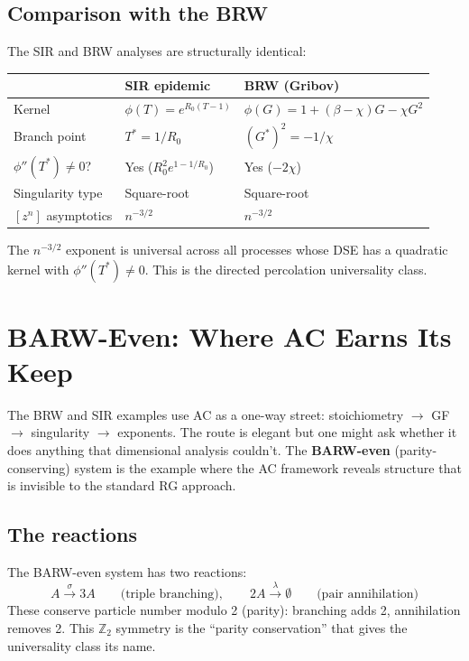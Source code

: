 \documentclass[11pt,a4paper]{article}
\theoremstyle{definition}
\begin{document}
\subsection{Comparison with the BRW}

The SIR and BRW analyses are structurally identical:
\begin{center}
\begin{tabular}{lll}
\toprule
& \textbf{SIR epidemic} & \textbf{BRW (Gribov)} \\
\midrule
Kernel & $\phi(T) = e^{R_0(T-1)}$ & $\phi(G) = 1 + (\beta{-}\chi)G - \chi G^2$ \\
Branch point & $T^* = 1/R_0$ & $(G^*)^2 = -1/\chi$ \\
$\phi''(T^*) \neq 0$? & Yes ($R_0^2 e^{1-1/R_0}$) & Yes ($-2\chi$) \\
Singularity type & Square-root & Square-root \\
$[z^n]$ asymptotics & $n^{-3/2}$ & $n^{-3/2}$ \\
\bottomrule
\end{tabular}
\end{center}

The $n^{-3/2}$ exponent is universal across all processes whose DSE
has a quadratic kernel with $\phi''(T^*) \neq 0$. This is the directed
percolation universality class.

\section{BARW-Even: Where AC Earns Its Keep}
\label{app:barw}

The BRW and SIR examples use AC as a one-way street: stoichiometry $\to$
GF $\to$ singularity $\to$ exponents. The route is elegant but one might
ask whether it does anything that dimensional analysis couldn't. The
\textbf{BARW-even} (parity-conserving) system is the example where the
AC framework reveals structure that is invisible to the standard RG
approach.

\subsection{The reactions}

The BARW-even system has two reactions:
\begin{equation}
A \xrightarrow{\;\sigma\;} 3A \qquad\text{(triple branching)}, \qquad
2A \xrightarrow{\;\lambda\;} \emptyset \qquad\text{(pair annihilation)}
\end{equation}
These conserve particle number modulo 2 (parity): branching adds 2,
annihilation removes 2. This $\mathbb{Z}_2$ symmetry is the ``parity
conservation'' that gives the universality class its name.
\end{document}
